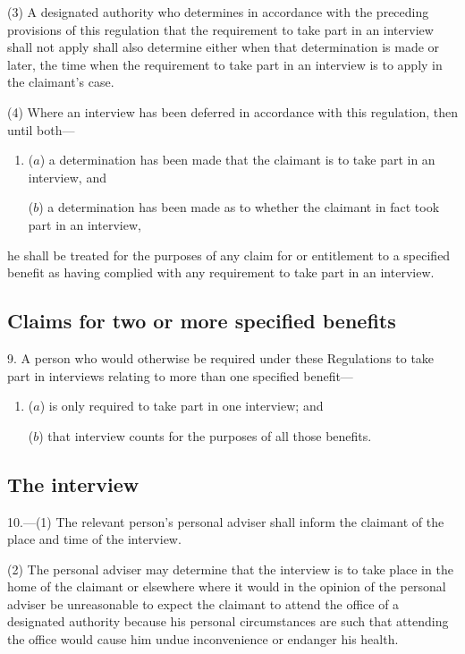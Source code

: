 \documentclass[12pt,a4paper]{article}
\begin{document}
(3) A designated authority who determines in accordance with the preceding provisions of this regulation that the requirement to take part in an interview shall not apply shall also determine either when that determination is made or later, the time when the requirement to take part in an interview is to apply in the claimant’s case.

(4) Where an interview has been deferred in accordance with this regulation, then until both—
\begin{enumerate}\item[]
($a$) a determination has been made that the claimant is to take part in an interview, and

($b$) a determination has been made as to whether the claimant in fact took part in an interview,
\end{enumerate}
he shall be treated for the purposes of any claim for or entitlement to a specified benefit as having complied with any requirement to take part in an interview.

\subsection[9. Claims for two or more specified benefits]{Claims for two or more specified benefits}

9.  A person who would otherwise be required under these Regulations to take part in interviews relating to more than one specified benefit—
\begin{enumerate}\item[]
($a$) is only required to take part in one interview; and

($b$) that interview counts for the purposes of all those benefits.
\end{enumerate}

\subsection[10. The interview]{The interview}

10.---(1)  The relevant person’s personal adviser shall inform the claimant of the place and time of the interview.

(2) The personal adviser may determine that the interview is to take place in the home of the claimant or elsewhere where it would in the opinion of the personal adviser be unreasonable to expect the claimant to attend the office of a designated authority because his personal circumstances are such that attending the office would cause him undue inconvenience or endanger his health.
\end{document}
